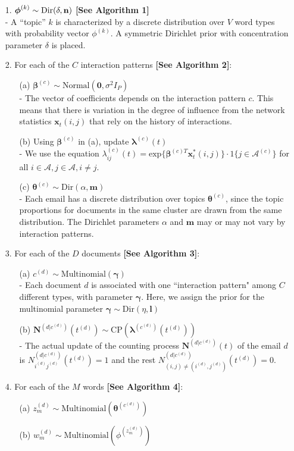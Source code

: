 \documentclass[a4paper]{article}
\begin{document}
\begin{itemize}
	\item[1.] {$\boldsymbol{\phi}^{(k)} \sim \mbox{Dir}(\delta, \bf n)$} \textbf{[See Algorithm 1]}\\
	- A “topic” $k$ is characterized by a discrete distribution over $V$ word types with probability vector $\phi^{(k)}$. A symmetric Dirichlet prior with concentration parameter $\delta$ is placed.
\item[2.] For each of the $C$ interaction patterns \textbf{[See Algorithm 2]}:
\begin{itemize}
	\item[(a)] $\boldsymbol{\beta}^{(c)}\sim \mbox{Normal}(\textbf{0}, \sigma^2I_P)$\\ 
	- The vector of coefficients depends on the interaction pattern $c$. This means that there is variation in the degree of influence from the network statistics $\boldsymbol{x}_t(i, j)$ that rely on the history of interactions.
	\item[(b)] Using $\boldsymbol{\beta}^{(c)}$ in (a), update $\boldsymbol{\lambda}^{(c)}(t)$\\
	- We use the equation $\lambda^{(c)}_{ij}(t)= \mbox{exp}\Big\{\boldsymbol{\beta}^{(c)T}\boldsymbol{x}^*_t(i, j)\Big\}\cdot 1\{j \in \mathcal{A}^{(c)}\}$ for all $i \in \mathcal{A}, j \in \mathcal{A}, i\neq j$.
	\item[(c)] $\boldsymbol{\theta}^{(c)}\sim \mbox{Dir}(\alpha, \textbf{m})$\\
	- Each email has a discrete distribution over topics $\boldsymbol{\theta}^{(c)}$, since the topic proportions for documents in the same cluster are drawn from the same distribution. The Dirichlet parameters $\alpha$ and $\textbf{m}$ may or may not vary by interaction patterns.
\end{itemize}
\item[3.] For each of the $D$ documents \textbf{[See Algorithm 3]}:
\begin{itemize}
	\item[(a)] $c^{(d)}\sim \mbox{Multinomial}(\boldsymbol{\gamma})$\\
	- Each document $d$ is associated with one ``interaction pattern" among $C$ different types, with parameter $\boldsymbol{\gamma}$. Here, we assign the prior for the multinomial parameter $\boldsymbol{\gamma} \sim \mbox{Dir}({\eta}, \boldsymbol{l})$
	\item[(b)] $\mathbf{N}^{(d|c^{(d)})}(t^{(d)}) \sim \mbox{CP}(\boldsymbol{\lambda}^{(c^{(d)})}(t^{(d)}))$\\
	- The actual update of the counting process $\mathbf{N}^{(d|c^{(d)})}(t)$ of the email $d$ is  $N^{(d|c^{(d)})}_{i^{(d)}j^{(d)}}(t^{(d)})=1$ and the rest $N^{(d|c^{(d)})}_{(i, j) \neq (i^{(d)}, j^{(d)})}(t^{(d)})=0$.
\end{itemize}
\item[4.] For each of the $M$ words \textbf{[See Algorithm 4]}:
\begin{itemize}
	\item[(a)] $z_m^{(d)} \sim \mbox{Multinomial}(\boldsymbol{\theta}^{(c^{(d)})})$
\item[(b)] $w_m^{(d)} \sim\mbox{Multinomial} (\phi^{(z_m^{(d)})})$
\end{itemize}
\end{itemize} 
\end{document}
